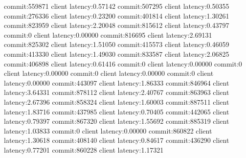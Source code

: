 commit:559871 client latency:0.57142
commit:507295 client latency:0.50355
commit:276336 client latency:0.23200
commit:401814 client latency:1.30261
commit:823959 client latency:2.20048
commit:815612 client latency:0.43797
commit:0 client latency:0.00000
commit:816695 client latency:2.69131
commit:825302 client latency:1.51050
commit:415573 client latency:0.46059
commit:413330 client latency:1.49030
commit:833587 client latency:2.06825
commit:406898 client latency:0.61416
commit:0 client latency:0.00000
commit:0 client latency:0.00000
commit:0 client latency:0.00000
commit:0 client latency:0.00000
commit:443097 client latency:1.86333
commit:846964 client latency:3.64331
commit:878112 client latency:2.40767
commit:863963 client latency:2.67396
commit:858324 client latency:1.60003
commit:887511 client latency:1.83716
commit:437985 client latency:0.70405
commit:442065 client latency:0.79397
commit:867320 client latency:1.55692
commit:885319 client latency:1.03833
commit:0 client latency:0.00000
commit:860822 client latency:1.30618
commit:408140 client latency:0.84617
commit:436290 client latency:0.77201
commit:860228 client latency:1.17321
